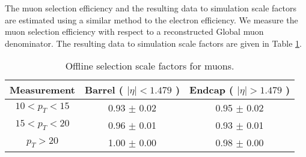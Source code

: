 
The muon selection efficiency and the resulting data to simulation
scale factors are estimated using a similar method to the electron efficiency. 
We measure the muon selection efficiency with respect to a reconstructed Global muon
denominator. 
The resulting data to simulation scale factors are given in Table \ref{tab:eff_mu_offline}.

\begin{table}[!ht]
\begin{center}
\begin{tabular}{c|c|c}
\hline
Measurement & Barrel ( $|\eta|<1.479$ )   & Endcap ( $|\eta|>1.479$ )  \\ 
\hline
$  10<p_T<  15$ & 0.93 $\pm$ 0.02  & 0.95 $\pm$ 0.02  \\ \hline 
$  15<p_T<  20$ & 0.96 $\pm$ 0.01  & 0.93 $\pm$ 0.01  \\ \hline 
$  p_T>     20$ & 1.00 $\pm$ 0.00  & 0.98 $\pm$ 0.00  \\ \hline
\end{tabular}
\caption{Offline selection scale factors for muons.}
\label{tab:eff_mu_offline}
\end{center}
\end{table}

